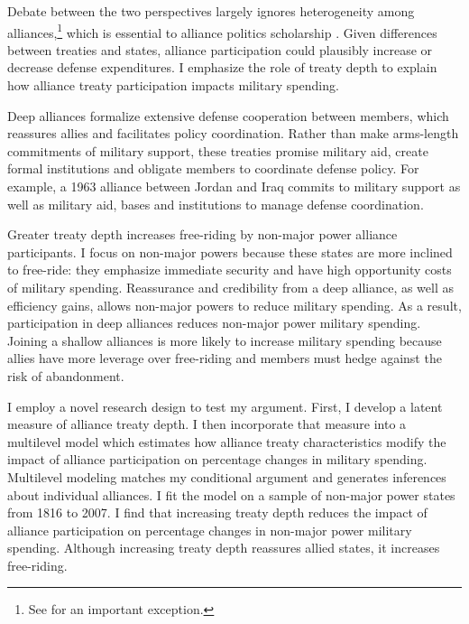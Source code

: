 \documentclass[12pt]{article}
\begin{document}
Debate between the two perspectives largely ignores heterogeneity among alliances,\footnote{See \citet{DigiuseppePoast2016} for an important exception.} which is essential to alliance politics scholarship \citep{Morrow1991, Leeds2003, LeedsAnac2005, Fordham2010, Mattes2012, Benson2012, Poast2013, Johnsonetal2015}.  
Given differences between treaties and states, alliance participation could plausibly increase or decrease defense expenditures. 
I emphasize the role of treaty depth to explain how alliance treaty participation impacts military spending. 


Deep alliances formalize extensive defense cooperation between members, which reassures allies and facilitates policy coordination. 
Rather than make arms-length commitments of military support, these treaties promise military aid, create formal institutions and obligate members to coordinate defense policy. 
For example, a 1963 alliance between Jordan and Iraq commits to military support as well as military aid, bases and institutions to manage defense coordination. 


Greater treaty depth increases free-riding by non-major power alliance participants. 
I focus on non-major powers because these states are more inclined to free-ride: they emphasize immediate security and have high opportunity costs of military spending. 
Reassurance and credibility from a deep alliance, as well as efficiency gains, allows non-major powers to reduce military spending. 
As a result, participation in deep alliances reduces non-major power military spending. 
Joining a shallow alliances is more likely to increase military spending because allies have more leverage over free-riding and members must hedge against the risk of abandonment.  
 

I employ a novel research design to test my argument.
First, I develop a latent measure of alliance treaty depth. 
I then incorporate that measure into a multilevel model which estimates how alliance treaty characteristics modify the impact of alliance participation on percentage changes in military spending.
Multilevel modeling matches my conditional argument and generates inferences about individual alliances. 
I fit the model on a sample of non-major power states from 1816 to 2007. 
I find that increasing treaty depth reduces the impact of alliance participation on percentage changes in non-major power military spending.
Although increasing treaty depth reassures allied states, it increases free-riding. 
\end{document}

